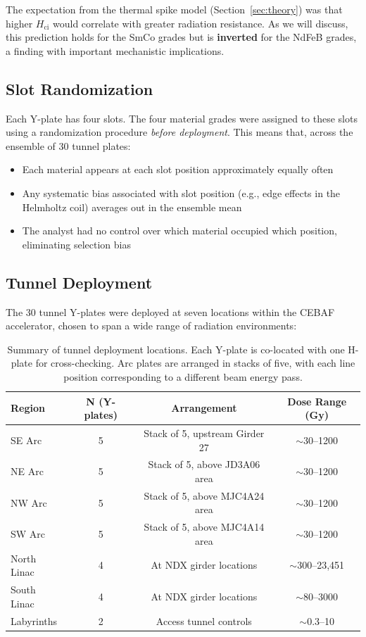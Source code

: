 \documentclass[11pt,letterpaper]{article}
\newcommand{\ndfeb}{NdFeB}
\newcommand{\smco}{SmCo}
\newcommand{\Hci}{H_\mathrm{ci}}
\newcommand{\CEBAF}{CEBAF}
\begin{document}
The expectation from the thermal spike model (Section~\ref{sec:theory}) was
that higher $\Hci$ would correlate with greater radiation resistance. As we
will discuss, this prediction holds for the \smco{} grades but is
\textbf{inverted} for the \ndfeb{} grades, a finding with important
mechanistic implications.

\subsection{Slot Randomization}

Each Y-plate has four slots. The four material grades were assigned to these
slots using a randomization procedure \emph{before deployment}. This means
that, across the ensemble of 30 tunnel plates:
\begin{itemize}
    \item Each material appears at each slot position approximately equally
    often
    \item Any systematic bias associated with slot position (e.g., edge effects
    in the Helmholtz coil) averages out in the ensemble mean
    \item The analyst had no control over which material occupied which position,
    eliminating selection bias
\end{itemize}

\subsection{Tunnel Deployment}
\label{sec:deployment}

The 30 tunnel Y-plates were deployed at seven locations within the \CEBAF
accelerator, chosen to span a wide range of radiation environments:

\begin{table}[H]
\centering
\caption{Summary of tunnel deployment locations. Each Y-plate is co-located
with one H-plate for cross-checking. Arc plates are arranged in stacks of five,
with each line position corresponding to a different beam energy pass.}
\label{tab:deployment}
\begin{tabular}{@{}lccc@{}}
\toprule
\textbf{Region} & \textbf{N (Y-plates)} & \textbf{Arrangement} & \textbf{Dose Range (Gy)} \\
\midrule
SE Arc    & 5 & Stack of 5, upstream Girder 27 & $\sim$30--1200 \\
NE Arc    & 5 & Stack of 5, above JD3A06 area & $\sim$30--1200 \\
NW Arc    & 5 & Stack of 5, above MJC4A24 area & $\sim$30--1200 \\
SW Arc    & 5 & Stack of 5, above MJC4A14 area & $\sim$30--1200 \\
North Linac & 4 & At NDX girder locations & $\sim$300--23,451 \\
South Linac & 4 & At NDX girder locations & $\sim$80--3000 \\
Labyrinths  & 2 & Access tunnel controls & $\sim$0.3--10 \\
\bottomrule
\end{tabular}
\end{table}
\end{document}
